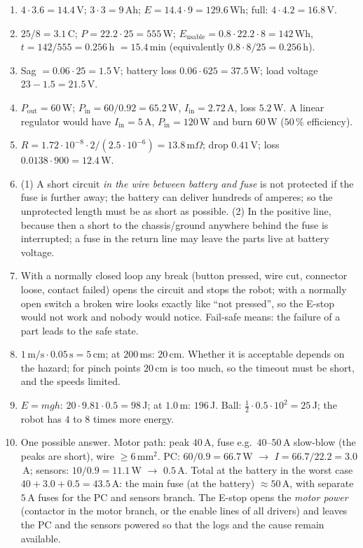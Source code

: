 \begin{enumerate}[label=\textbf{\ansnum.\arabic*}]
  \item $4\cdot3.6=14.4$\,V; $3\cdot3=9$\,Ah; $E=14.4\cdot9=129.6$\,Wh; full: $4\cdot4.2=16.8$\,V.
  \item $25/8=3.1$\,C; $P=22.2\cdot25=555$\,W; $E_\text{usable}=0.8\cdot22.2\cdot8=142$\,Wh, $t=142/555=0.256$\,h $=15.4$\,min (equivalently $0.8\cdot8/25=0.256$\,h).
  \item Sag $=0.06\cdot25=1.5$\,V; battery loss $0.06\cdot625=37.5$\,W; load voltage $23-1.5=21.5$\,V.
  \item $P_\text{out}=60$\,W; $P_\text{in}=60/0.92=65.2$\,W, $I_\text{in}=2.72$\,A, loss $5.2$\,W. A linear regulator would have $I_\text{in}=5$\,A, $P_\text{in}=120$\,W and burn $60$\,W ($50\,\%$ efficiency).
  \item $R=1.72\cdot10^{-8}\cdot2/(2.5\cdot10^{-6})=13.8$\,m$\Omega$; drop $0.41$\,V; loss $0.0138\cdot900=12.4$\,W.
  \item (1) A short circuit \emph{in the wire between battery and fuse} is not protected if the fuse is further away; the battery can deliver hundreds of amperes; so the unprotected length must be as short as possible. (2) In the positive line, because then a short to the chassis/ground anywhere behind the fuse is interrupted; a fuse in the return line may leave the parts live at battery voltage.
  \item With a normally closed loop any break (button pressed, wire cut, connector loose, contact failed) opens the circuit and stops the robot; with a normally open switch a broken wire looks exactly like ``not pressed'', so the E-stop would not work and nobody would notice. Fail-safe means: the failure of a part leads to the safe state.
  \item $1\,\text{m/s}\cdot0.05\,\text{s}=5$\,cm; at $200$\,ms: $20$\,cm. Whether it is acceptable depends on the hazard; for pinch points $20$\,cm is too much, so the timeout must be short, and the speeds limited.
  \item $E=mgh$: $20\cdot9.81\cdot0.5=98$\,J; at $1.0$\,m: $196$\,J. Ball: $\frac12\cdot0.5\cdot10^2=25$\,J; the robot has $4$ to $8$ times more energy.
  \item[\textbf{\ansnum.10}] One possible answer. Motor path: peak $40$\,A, fuse e.g.\ $40$--$50$\,A slow-blow (the peaks are short), wire $\ge6$\,mm$^2$. PC: $60/0.9=66.7$\,W $\to$ $I=66.7/22.2=3.0$\,A; sensors: $10/0.9=11.1$\,W $\to$ $0.5$\,A. Total at the battery in the worst case $40+3.0+0.5=43.5$\,A: the main fuse (at the battery) $\approx50$\,A, with separate $5$\,A fuses for the PC and sensors branch. The E-stop opens the \emph{motor power} (contactor in the motor branch, or the enable lines of all drivers) and leaves the PC and the sensors powered so that the logs and the cause remain available.
\end{enumerate}
